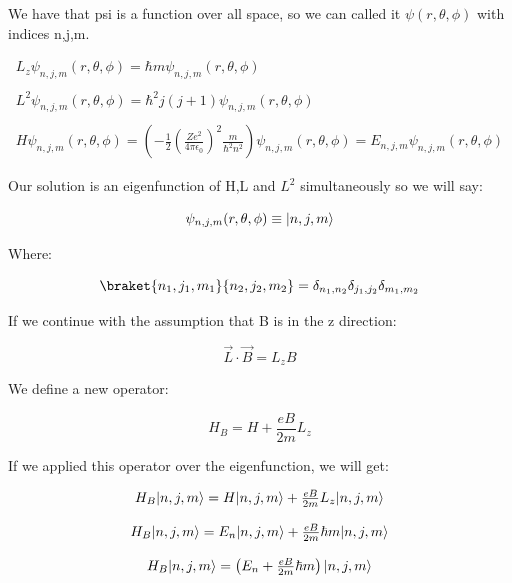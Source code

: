 We have that psi is a function over all space, so we can called it $\psi(r,\theta,\phi)$ with indices n,j,m.

\begin{equation}
  \begin{array}{c}
    L_z \psi_{n,j,m}(r,\theta,\phi) = \hbar m \psi_{n,j,m}(r,\theta,\phi)
    \\

    \\
    L^2 \psi_{n,j,m}(r,\theta,\phi) = \hbar^2 j(j+1) \psi_{n,j,m}(r,\theta,\phi)
    \\

    \\
    H \psi_{n,j,m}(r,\theta,\phi) = \left(-\frac{1}{2}\left(\frac{Ze^2}{4\pi\epsilon_0}\right)^2\frac{m}{\hbar^2 n^2}\right)\psi_{n,j,m}(r,\theta,\phi) = E_{n,j,m} \psi_{n,j,m}(r,\theta,\phi)
  \end{array}
\end{equation}

Our solution is an eigenfunction of H,L and $L^2$ simultaneously so we will say:

\begin{equation}
  \psi_{n,j,m}(r,\theta,\phi) \equiv \lvert n,j,m\rangle
\end{equation}

Where:

\begin{equation}
  \braket{n_1,j_1,m_1}{n_2,j_2,m_2} = \delta_{n_1,n_2}\delta_{j_1,j_2}\delta_{m_1,m_2}
\end{equation}

If we continue with the assumption that B is in the z direction:

\begin{equation}
  \vec{L}\cdot\vec{B} = L_z B
\end{equation}

We define a new operator:

\begin{equation}
  H_B = H + \frac{eB}{2m} L_z
\end{equation}

If we applied this operator over the eigenfunction, we will get:

\begin{equation}
  \begin{array}{c}
    H_B \lvert n,j,m\rangle = H\lvert n,j,m\rangle + \frac{eB}{2m} L_z \lvert n,j,m\rangle
    \\

    \\
    H_B \lvert n,j,m\rangle = E_n \lvert n,j,m\rangle + \frac{eB}{2m} \hbar m \lvert n,j,m\rangle
    \\

    \\
    H_B \lvert n,j,m\rangle = \left(E_n + \frac{eB}{2m} \hbar m\right) \lvert n,j,m\rangle
  \end{array}
\end{equation}

